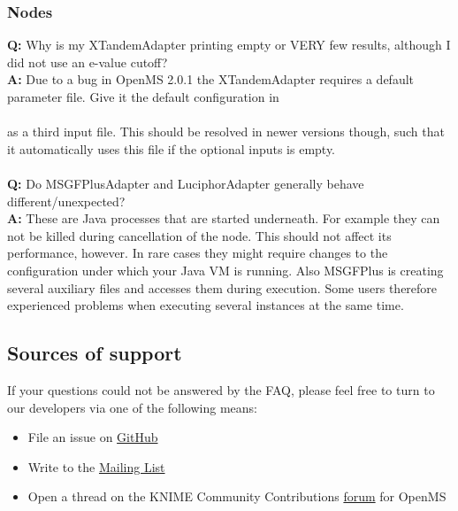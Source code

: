 \subsubsection{Nodes}
\textbf{Q:} Why is my XTandemAdapter printing empty or VERY few results, although I did not use an e-value cutoff?\\
\textbf{A:} Due to a bug in OpenMS 2.0.1 the XTandemAdapter requires a default parameter file. Give it the default configuration in\\
\\
 as a third input file. This should be resolved in newer versions though, such that it automatically uses this file if the optional inputs is empty.
\\\\
\textbf{Q:} Do MSGFPlusAdapter and LuciphorAdapter generally behave different/unexpected?\\
\textbf{A:} These are Java processes that are started underneath. For example they can not be killed during 
cancellation of the node.
This should not affect its performance, however. In rare cases they might require changes to the configuration under 
which your Java VM is running. Also MSGFPlus is creating several auxiliary files and accesses them during execution. 
Some users therefore experienced problems when executing several instances at the same time.
\subsection{Sources of support}
If your questions could not be answered by the FAQ, please feel free to turn to our developers via one of the following means:
\begin{itemize}
\item File an issue on \href{https://github.com/OpenMS/OpenMS/issues}{GitHub}
\item Write to the \href{mailto:open-ms-developers@lists.sourceforge.net}{Mailing List}
\item Open a thread on the KNIME Community Contributions \href{https://tech.knime.org/forum/openms}{forum} for OpenMS
\end{itemize}
